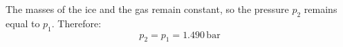 The masses of the ice and the gas remain constant, so the pressure \( p_2 \) remains equal to \( p_1 \). Therefore:  
\[
p_2 = p_1 = 1.490 \, \text{bar}
\]